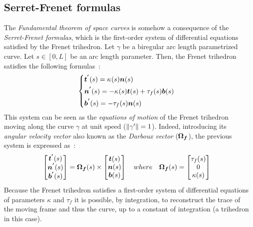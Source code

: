 \subsection{Serret-Frenet formulas}\label{sec:serret}
The \emph{Fundamental theorem of space curves} is somehow a consequence of the \emph{Serret-Frenet formulas}, which is the first-order system of differential equations satisfied by the Frenet trihedron. Let $\gamma$ be a biregular arc length parametrized curve. Let $s \in [0,L]$ be an arc length parameter. Then, the Frenet trihedron satisfies the following formulas~:
\begin{equation}
	\left\{
	\begin{aligned}
		&\boldsymbol{t^{'}}(s) 	=  \kappa_{}(s) \boldsymbol{n}(s)\\
		&\boldsymbol{n^{'}}(s) 	=  -\kappa_{}(s) \boldsymbol{t}(s) + \tau_f(s) \boldsymbol{b}(s) \\
		&\boldsymbol{b^{'}}(s) 	=  -\tau_f(s) \boldsymbol{n}(s) \\
	\end{aligned}
	\right.
\end{equation}
This system can be seen as the \emph{equations of motion} of the Frenet trihedron moving along the curve $\gamma$ at unit speed ($\lVert\gamma'\rVert=1$). Indeed, introducing its \emph{angular velocity vector} also known as the \emph{Darboux vector} ($\boldsymbol{\Omega_f}$), the previous system is expressed as~:
\begin{equation}
	\begin{bmatrix}		
		\boldsymbol{t^{'}}(s) \\
		\boldsymbol{n^{'}}(s) \\
		\boldsymbol{b^{'}}(s) \\
	\end{bmatrix}
	=
	\boldsymbol{\Omega_f}(s)
	\times
	\begin{bmatrix}		
		\boldsymbol{t}(s) \\
		\boldsymbol{n}(s) \\
		\boldsymbol{b}(s) \\
	\end{bmatrix}
	\quad where \quad
	\boldsymbol{\Omega_f}(s)
	=
	\begin{bmatrix}
		\tau_f(s) \\
		0 \\
		\kappa(s)
	\end{bmatrix}
\end{equation}
Because the Frenet trihedron satisfies a first-order system of differential equations of parameters $\kappa$ and $\tau_f$ it is possible, by integration, to reconstruct the trace of the moving frame and thus the curve, up to a constant of integration (a trihedron in this case).

